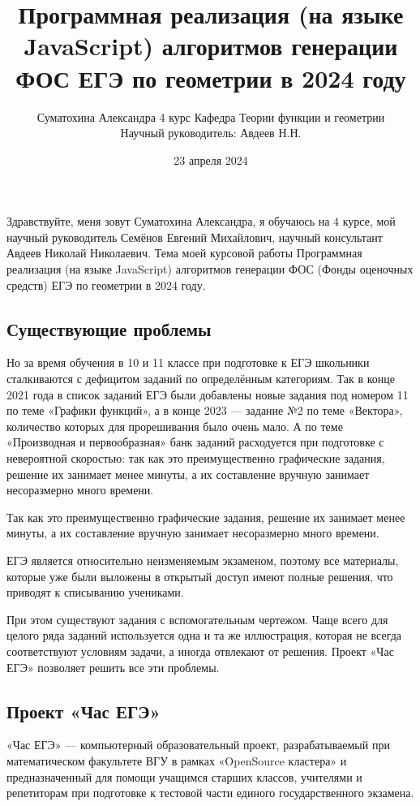\documentclass[a4paper, 12pt]{extarticle}
\title{Программная реализация (на языке JavaScript) алгоритмов генерации ФОС ЕГЭ по геометрии в 2024 году}
\author{Суматохина Александра 4 курс Кафедра Теории функции и геометрии\\Научный руководитель: Авдеев Н.Н.}
\date{23 апреля 2024}
\begin{document}
\maketitle

Здравствуйте, меня зовут Суматохина Александра, я обучаюсь на 4 курсе, мой научный руководитель Семёнов Евгений Михайлович, научный консультант Авдеев Николай Николаевич. Тема моей курсовой работы Программная реализация (на языке JavaScript) алгоритмов генерации ФОС (Фонды оценочных средств) ЕГЭ по геометрии в 2024 году.

\subsection*{Существующие проблемы}
Но за время обучения в 10 и 11 классе при подготовке к ЕГЭ школьники сталкиваются с дефицитом заданий по определённым категориям.
Так в конце 2021 года в список заданий ЕГЭ были добавлены новые задания под номером 11 по теме «Графики функций», а в конце 2023 — задание №2 по теме «Вектора», количество которых для прорешивания было очень мало. 
А по теме «Производная и первообразная» банк заданий расходуется при подготовке с невероятной скоростью:
так как это преимущественно графические задания, решение их занимает менее минуты, а их составление вручную занимает несоразмерно много времени.

Так как это преимущественно графические задания, решение их занимает менее минуты, а их составление вручную занимает несоразмерно много времени.

ЕГЭ является относительно неизменяемым экзаменом, поэтому все материалы, которые уже были выложены в открытый доступ имеют полные решения, что приводят к списыванию учениками.

При этом существуют задания с вспомогательным чертежом. Чаще всего для целого ряда заданий используется одна и та же иллюстрация, которая не всегда соответствуют условиям задачи, а иногда отвлекают от решения.
Проект «Час ЕГЭ» позволяет решить все эти проблемы.

\subsection*{Проект «Час ЕГЭ»}
«Час ЕГЭ» — компьютерный образовательный проект, разрабатываемый при математическом
факультете ВГУ в рамках «OpenSource кластера» и предназначенный для помощи учащимся
старших классов, учителями и репетиторам при подготовке к тестовой части единого государственного экзамена.
\end{document}
